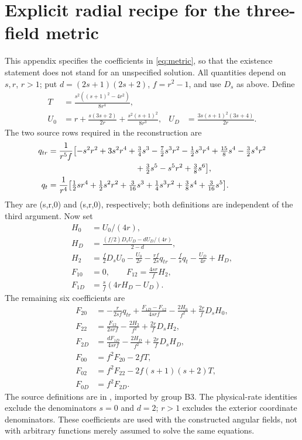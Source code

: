 \section{Explicit radial recipe for the three-field metric}\label{app:metric}

This appendix specifies the coefficients in \eqref{eq:metric}, so that the existence statement does not stand for an unspecified solution. All quantities depend on \(s,r\), \(r>1\); put \(d=(2s+1)(2s+2)\), \(f=r^2-1\), and use \(D_s\) as above. Define
\begin{align*}
 T&=\frac{s^2((s+1)^2-4r^2)}{8r^4},\\
 U_0&=r+\frac{s(3s+2)}{2r}+\frac{s^2(s+1)^2}{8r^3},&
 U_D&=\frac{3s(s+1)^2(3s+4)}{2r}.
\end{align*}
The two source rows required in the reconstruction are
\begin{align*}
 q_{tr}={}&\frac1{r^5f}\bigl[-s^2r^2+3s^2r^4+\tfrac34s^3
 -\tfrac72s^3r^2-\tfrac12s^3r^4+\tfrac{15}8s^4
 -\tfrac32s^4r^2\\
 &\hspace{33mm}+\tfrac32s^5-s^5r^2+\tfrac38s^6\bigr],\\
 q_t={}&\frac1{r^4}\bigl[\tfrac12sr^4+\tfrac12s^2r^2+\tfrac3{16}s^3
                  +\tfrac14s^3r^2+\tfrac38s^4+\tfrac3{16}s^5\bigr].
\end{align*}
They are (s,r,0) and (s,r,0), respectively; both definitions are independent of the third argument. Now set
\begin{align*}
 H_0&=U_0/(4r),\\
 H_D&=\frac{(f/2)D_sU_D-dU_D/(4r)}{2-d},\\
 H_2&=\frac f2D_sU_0-\frac{U_0}{2r}
       -\frac{rf}{2s}q_{tr}-\frac fs q_t-\frac{U_D}{4r}+H_D,\\
 F_{10}&=0,\qquad F_{12}=\frac{4sr}{f}H_2,\\
 F_{1D}&=\frac{s}{f}(4rH_D-U_D).
\end{align*}
The remaining six coefficients are
\begin{align*}
 F_{20}&=-\frac{r}{2sf}q_{tr}+\frac{F_{1D}-F_{12}}{4srf}
                      -\frac{2H_0}{f^2}+\frac{2r}{f}D_sH_0,\\
 F_{22}&=\frac{F_{12}}{2srf}-\frac{2H_2}{f^2}+\frac{2r}{f}D_sH_2,\\
 F_{2D}&=\frac{dF_{1D}}{4srf}-\frac{2H_D}{f^2}+\frac{2r}{f}D_sH_D,\\
 F_{00}&=f^2F_{20}-2fT,\\
 F_{02}&=f^2F_{22}-2f(s+1)(s+2)T,\\
 F_{0D}&=f^2F_{2D}.
\end{align*}
The source definitions are in , imported by group B3. The physical-rate identities exclude the denominators \(s=0\) and \(d=2\); \(r>1\) excludes the exterior coordinate denominators. These coefficients are used with the constructed angular fields, not with arbitrary functions merely assumed to solve the same equations.
